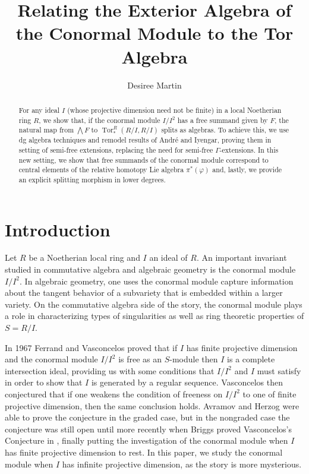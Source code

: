 \documentclass{amsart}
\title{Relating the Exterior Algebra of the Conormal Module to the Tor Algebra}
\date{}
\author[D. Martin]{Desiree Martin}
\theoremstyle{definition}
\newcounter{intro}
\theoremstyle{remark}
\newcommand{\Tor}{\ensuremath{\operatorname{Tor}}}
\begin{document}


\begin{abstract}
For any ideal $I$ (whose projective dimension need not be finite) in a local Noetherian ring $R$, we show that, if the conormal module $I/I^2$ has a free summand given by $F$, the natural map from $\bigwedge F$ to $\Tor_{*}^{R}(R/I,R/I)$ splits as algebras. To achieve this, we use dg algebra techniques and  remodel results of André and Iyengar, proving them in setting of semi-free extensions, replacing the need for semi-free $\Gamma$-extensions. In this new setting, we show that free summands of the conormal module correspond to central elements of the relative homotopy Lie algebra $\pi^*(\varphi)$ and, lastly, we provide an explicit splitting morphism in lower degrees.

\end{abstract}

\maketitle

\section{Introduction}
\label{sec:intro}

Let $R$ be a Noetherian local ring and $I$ an ideal of $R$. An important invariant studied in commutative algebra and algebraic geometry is the conormal module $I/I^2$. In algebraic geometry, one uses the conormal module capture information about the tangent behavior of a subvariety that is embedded within a larger variety. On the commutative algebra side of the story, the conormal module plays a role in characterizing types of singularities as well as ring theoretic properties of $S=R/I$. 

In 1967 Ferrand \cite{Ferrand} and Vasconcelos \cite{vasconcelos1967ideals} proved that if $I$ has finite projective dimension and the conormal module $I/I^2$ is free as an $S$-module then $I$ is a complete intersection ideal, providing us with some conditions that $I/I^2$ and $I$ must satisfy in order to show that $I$ is generated by a regular sequence. Vasconcelos then conjectured that if one weakens the condition of freeness on $I/I^2$ to one of finite projective dimension, then the same conclusion holds. Avramov and Herzog \cite{avramov1994jacobian} were able to prove the conjecture in the graded case, but in the nongraded case the conjecture was still open until more recently when Briggs proved Vasconcelos's Conjecture in \cite{Briggs}, finally putting the investigation of the conormal module when $I$ has finite projective dimension to rest. In this paper, we study the conormal module when $I$ has infinite projective dimension, as the story is more mysterious.
\end{document}
